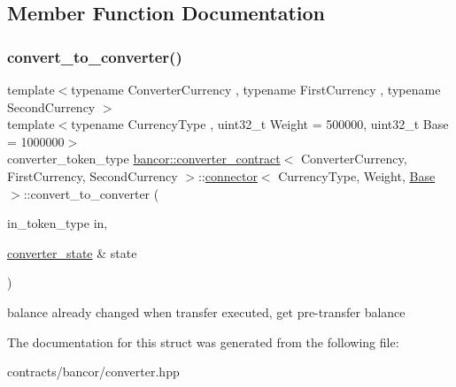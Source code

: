 \subsection{Member Function Documentation}
\mbox{\label{structbancor_1_1converter__contract_1_1connector_a64f2755a7c9e6a66742af82ebf601421}} 
\subsubsection{\texorpdfstring{convert\+\_\+to\+\_\+converter()}{convert\_to\_converter()}}
{\footnotesize\ttfamily template$<$typename Converter\+Currency , typename First\+Currency , typename Second\+Currency $>$ \\
template$<$typename Currency\+Type , uint32\+\_\+t Weight = 500000, uint32\+\_\+t Base = 1000000$>$ \\
converter\+\_\+token\+\_\+type \mbox{\hyperlink{classbancor_1_1converter__contract}{bancor\+::converter\+\_\+contract}}$<$ Converter\+Currency, First\+Currency, Second\+Currency $>$\+::\mbox{\hyperlink{structbancor_1_1converter__contract_1_1connector}{connector}}$<$ Currency\+Type, Weight, \mbox{\hyperlink{struct_base}{Base}} $>$\+::convert\+\_\+to\+\_\+converter (\begin{DoxyParamCaption}\item[{in\+\_\+token\+\_\+type}]{in,  }\item[{\mbox{\hyperlink{structbancor_1_1converter__contract_1_1converter__state}{converter\+\_\+state}} \&}]{state }\end{DoxyParamCaption})\hspace{0.3cm}{\ttfamily [inline]}}

balance already changed when transfer executed, get pre-\/transfer balance 

The documentation for this struct was generated from the following file\+:\begin{DoxyCompactItemize}
\item 
contracts/bancor/converter.\+hpp\end{DoxyCompactItemize}
